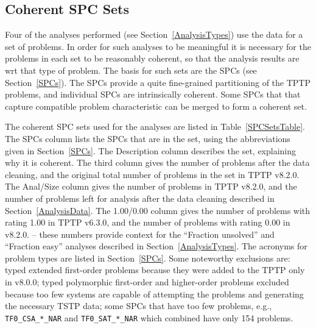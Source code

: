 \documentclass[runningheads]{llncs}
\begin{document}
\subsection{Coherent SPC Sets}
\label{SPCSets}

Four of the analyses performed (see Section~\ref{AnalysisTypes}) use the data for a set of 
problems.
In order for such analyses to be meaningful it is necessary for the problems in each set to be 
reasonably coherent, so that the analysis results are wrt that type of problem.
The basis for such sets are the SPCs (see Section~\ref{SPCs}).
The SPCs provide a quite fine-grained partitioning of the TPTP problems, and individual SPCs
are intrinsically coherent.
Some SPCs that that capture compatible problem characteristic can be merged to form a coherent set.

The coherent SPC sets used for the analyses are listed in Table~\ref{SPCSetsTable}.
The SPCs column lists the SPCs that are in the set, using the abbreviations given in 
Section~\ref{SPCs}.
The Description column describes the set, explaining why it is coherent.
The third column gives the number of problems after the data cleaning, and the original
total number of problems in the set in TPTP v8.2.0.
The Anal/Size column gives the number of problems in TPTP v8.2.0, and the number of problems 
left for analysis after the data cleaning described in Section~\ref{AnalysisData}.
The 1.00/0.00 column gives the number of problems with rating 1.00 in TPTP v6.3.0, and the number
of problems with rating 0.00 in v8.2.0. -- these numbers provide context for the ``Fraction 
unsolved'' and ``Fraction easy'' analyses described in Section~\ref{AnalysisTypes}.
The acronyms for problem types are listed in Section~\ref{SPCs}.
Some noteworthy exclusions are:
typed extended first-order problems because they were added to the TPTP only in v8.0.0;
typed polymorphic first-order and higher-order problems excluded because too few systems are 
capable of attempting the problems and generating the necessary TSTP data;
some SPCs that have too few problems, e.g., {\tt TF0\_CSA\_*\_NAR} and {\tt TF0\_SAT\_*\_NAR} 
which combined have only 154 problems.
\end{document}
